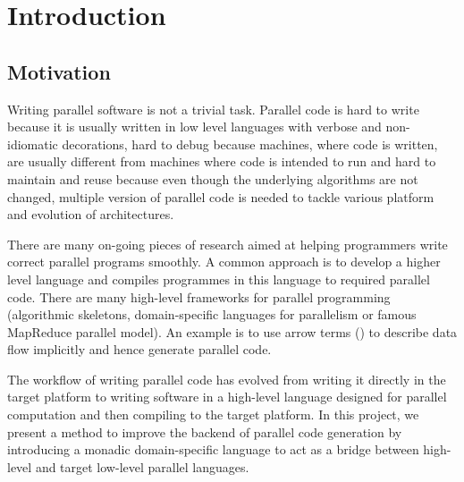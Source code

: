 \chapter{Introduction} \label{chap:intro}
% 

\section{Motivation} \label{i:m}
Writing parallel software is not a trivial task. Parallel code is hard to write because it is usually written in low level languages with verbose and non-idiomatic decorations, hard to debug because machines, where code is written, are usually different from machines where code is intended to run and hard to maintain and reuse because even though the underlying algorithms are not changed, multiple version of parallel code is needed to tackle various platform and evolution of architectures.

There are many on-going pieces of research aimed at helping programmers write correct parallel programs smoothly. A common approach is to develop a higher level language and compiles programmes in this language to required parallel code. There are many high-level frameworks for parallel programming (\eg algorithmic skeletons\cite{coleAlgorithmicSkeletonsStructured}, domain-specific languages for parallelism\cite{brownHeterogeneousParallelFramework2011} or famous MapReduce parallel model\cite{liMapReduceParallelProgramming2016}). An example is to use arrow terms () to describe data flow implicitly and hence generate parallel code.

The workflow of writing parallel code has evolved from writing it directly in the target platform to writing software in a high-level language designed for parallel computation and then compiling to the target platform. In this project, we present a method to improve the backend of parallel code generation by introducing a monadic domain-specific language to act as a bridge between high-level and target low-level parallel languages.

